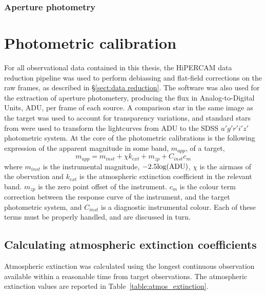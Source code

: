 \subsubsection{Aperture photometry}

\section{Photometric calibration}
\label{sect:photometric extraction and calibration}

For all observational data contained in this thesis, the HiPERCAM data reduction pipeline \citep{dhillon2016} was used to perform debiassing and flat-field corrections on the raw frames, as described in \S\ref{sect:data reduction}. The software was also used for the extraction of aperture photometery, producing the flux in Analog-to-Digital Units, ADU, per frame of each source. 
A comparison star in the same image as the target was used to account for transparency variations, and standard stars from \citet{smith2002} were used to transform the lightcurves from ADU to the SDSS $u'g'r'i'z'$ photometric system. At the core of the photometric calibrations is the following expression of the apparent magnitude in some band, $m_{app}$, of a target,
\begin{equation}
    \label{eqn:observations:instrumental magnitude from scratch}
    m_{app} = m_{inst} + \chi k_{ext} + m_{zp} + C_{inst}c_{m}
\end{equation}
where $m_{inst}$ is the instrumental magnitude, $-2.5 \rm log(ADU)$, $\chi$ is the airmass of the obervation and $k_{ext}$ is the atmospheric extinction coefficient in the relevant band. $m_{zp}$ is the zero point offset of the instrument. $c_{m}$ is the colour term correction between the response curve of the instrument, and the target photometric system, and $C_{inst}$ is a diagnostic instrumental colour. Each of these terms must be properly handled, and are discussed in turn. 


\subsection{Calculating atmospheric extinction coefficients}
\label{sect:calcualting atmospheric extinction}

Atmospheric extinction was calculated using the longest continuous observation available within a reasonable time from target observations.
The atmospheric extinction values are reported in Table~\ref{table:atmos_extinction}.

